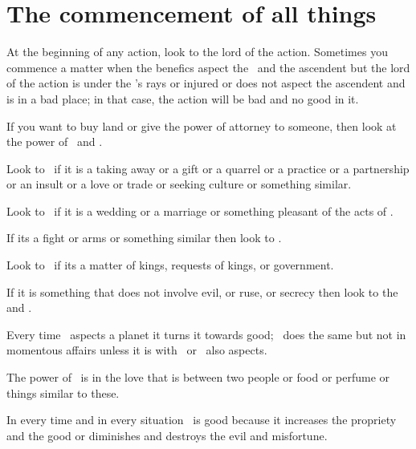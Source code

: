 \section{The commencement of all things}
At the beginning of any action, look to the lord of the action. Sometimes you commence a matter when the benefics aspect the \Moon\, and the ascendent but the lord of the action is under the \Sun's rays or injured or does not aspect the ascendent and is in a bad place; in that case, the action will be bad and no good in it.

If you want to buy land or give the power of attorney to someone, then look at the power of \Saturn\, and \Jupiter.

Look to \Mercury\, if it is a taking away or a gift or a quarrel or a practice or a partnership or an insult or a love or trade or seeking culture or something similar.

Look to \Venus\, if it is a wedding or a marriage or something pleasant of the acts of \Venus.

If its a fight or arms or something similar then look to \Mars.

Look to \Jupiter\, if its a matter of kings, requests of kings, or government.

If it is something that does not involve evil, or ruse, or secrecy then look to the \Sun\, and \Jupiter.

Every time \Jupiter\, aspects a planet it turns it towards good; \Venus\, does the same but not in momentous affairs unless it is with \Jupiter\, or \Jupiter\, also aspects.

The power of \Venus\, is in the love that is between two people or food or perfume or things similar to these.

In every time and in every situation \Jupiter\, is good because it increases the propriety and the good or diminishes and destroys the evil and misfortune.
